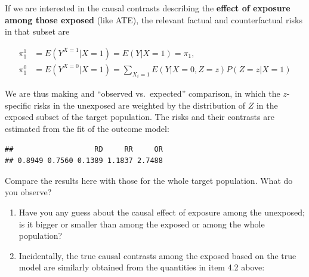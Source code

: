 \documentclass[
]{book}
\newenvironment{Shaded}{\begin{snugshade}}{\end{snugshade}}
\newcommand{\DecValTok}[1]{\textcolor[rgb]{0.00,0.00,0.81}{#1}}
\newcommand{\FunctionTok}[1]{\textcolor[rgb]{0.13,0.29,0.53}{\textbf{#1}}}
\newcommand{\NormalTok}[1]{#1}
\newcommand{\OtherTok}[1]{\textcolor[rgb]{0.56,0.35,0.01}{#1}}
\newcommand{\SpecialCharTok}[1]{\textcolor[rgb]{0.81,0.36,0.00}{\textbf{#1}}}
\begin{document}
If we are interested in the
causal contrasts describing the \textbf{effect
of exposure among those exposed} (like ATE),
the relevant factual and
counterfactual risks in that subset are

\[
\begin{aligned}
 \pi^1_1 & = E(Y^{X=1}|X=1) = E(Y|X=1) = \pi_1, \\
 \pi^0_1 & = E(Y^{X=0}|X=1) = \sum_{X_i=1} E(Y|X=0, Z=z)P(Z=z|X=1)
\end{aligned}
\]

We are thus making and ``observed vs.~expected'' comparison,
in which the
\(z\)-specific risks in the unexposed are weighted by the
distribution of
\(Z\) in the exposed subset of the target population.
The risks and their
contrasts are estimated from the fit of the outcome model:

\begin{Shaded}
\end{Shaded}

\begin{verbatim}
##                   RD     RR     OR 
## 0.8949 0.7560 0.1389 1.1837 2.7488
\end{verbatim}

Compare the results here with those for the whole target population. What do you observe?

\begin{enumerate}
\def\labelenumi{\arabic{enumi}.}
\setcounter{enumi}{1}
\item
  Have you any guess about the causal effect of exposure among
  the unexposed; is it bigger or smaller than among
  the exposed or among the whole population?
\item
  Incidentally, the true causal contrasts among the
  exposed based on the true model are similarly obtained
  from the quantities in item 4.2 above:
\end{enumerate}
\end{document}
